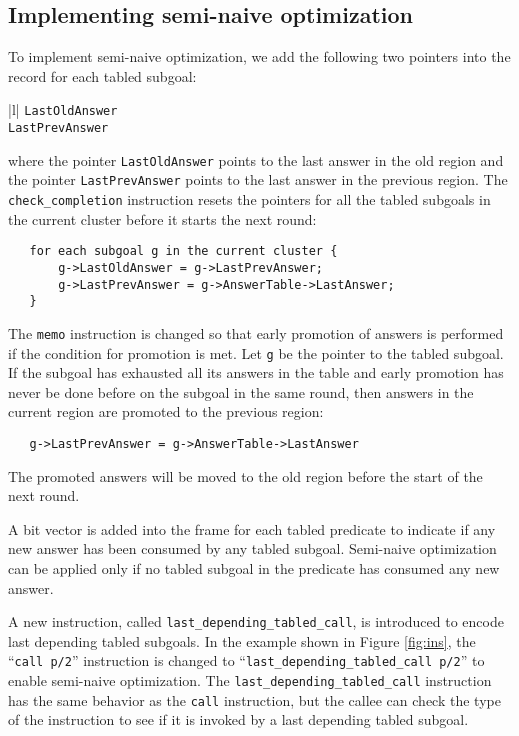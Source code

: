 \documentclass{tlp}
\begin{document}
\subsection{Implementing semi-naive optimization}
To implement semi-naive optimization, we add the following two pointers into the record for each tabled subgoal:
\begin{center}
\begin{oldtabular}{|l|}  \oldhline
{\tt LastOldAnswer} \\ \oldhline
{\tt LastPrevAnswer} \\ \oldhline
\end{oldtabular}
\end{center}
where the pointer {\tt LastOldAnswer} points to the last answer in the old region and the pointer {\tt LastPrevAnswer} points to the last answer in the previous region. The {\tt check\_completion} instruction resets the pointers for all the tabled subgoals in the current cluster before it starts the next round:
\begin{verbatim}
   for each subgoal g in the current cluster {
       g->LastOldAnswer = g->LastPrevAnswer;
       g->LastPrevAnswer = g->AnswerTable->LastAnswer;
   }
\end{verbatim}

The {\tt memo} instruction is changed so that early promotion of answers is performed if the condition for promotion is met. Let {\tt g} be the pointer to the tabled subgoal. If the subgoal has exhausted all its answers in the table and early promotion has never be done before on the subgoal in the same round, then answers in the current region are promoted to the previous region:
\begin{verbatim}
   g->LastPrevAnswer = g->AnswerTable->LastAnswer
\end{verbatim}
The promoted answers will be moved to the old region before the start of the next round.

A bit vector is added into the frame for each tabled predicate to indicate if any new answer has been consumed by any tabled subgoal. Semi-naive optimization can be applied only if no tabled subgoal in the predicate has consumed any new answer.

A new instruction, called {\tt last\_depending\_tabled\_call}, is introduced to encode last depending tabled subgoals.  In the example shown in Figure \ref{fig:ins}, the ``{\tt call p/2}'' instruction is changed to ``{\tt last\_depending\_tabled\_call p/2}'' to enable semi-naive optimization. The {\tt last\_depending\_tabled\_call} instruction has the same behavior as the {\tt call} instruction, but the callee can check the type of the instruction to see if it is invoked by a last depending tabled subgoal.
\end{document}
